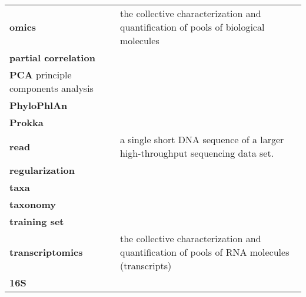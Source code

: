 \begin{singlespace}
\begin{longtable}{ p{}  p{} }
\textbf{omics} & the collective characterization and quantification of pools of biological molecules \\
\textbf{partial correlation} &  \\
\textbf{PCA} principle components analysis &  \\
\textbf{PhyloPhlAn} &  \\
\textbf{Prokka} &  \\
\textbf{read} & a single short DNA sequence of a larger high-throughput sequencing data set. \\
\textbf{regularization} &  \\
\textbf{taxa} &  \\
\textbf{taxonomy} &  \\
\textbf{training set} &  \\
\textbf{transcriptomics} & the collective characterization and quantification of pools of RNA molecules (transcripts) \\
\textbf{16S} &  \\

\end{longtable}
\end{singlespace}
